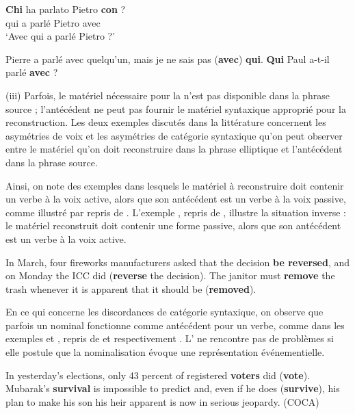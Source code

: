 \ex
\gll   *\textbf{Chi}  ha  parlato  Pietro  \textbf{con} ? \label{ch1:ex128b}\\
qui  a  parlé  Pietro  avec\\
\glt ‘Avec qui a parlé Pietro ?’ 
\z
\z


\ea \label{ch1:ex129}
\ea  Pierre a parlé avec quelqu’un, mais je ne sais pas (\textbf{avec}) \textbf{qui}. 
\ex  *\textbf{Qui} Paul a-t-il parlé \textbf{avec} ? 
\z
\z

(iii) Parfois, le matériel nécessaire pour la  n’est pas disponible dans la phrase source ; l’antécédent ne peut pas fournir le matériel syntaxique approprié pour la reconstruction. Les deux exemples discutés dans la littérature concernent les asymétries de voix et les asymétries de catégorie syntaxique qu’on peut observer entre le matériel qu’on doit reconstruire dans la phrase elliptique et l’antécédent dans la phrase source. 

Ainsi, on note des exemples dans lesquels le matériel à reconstruire doit contenir un verbe à la voix active, alors que son antécédent est un verbe à la voix passive, comme illustré par  repris de \citet{Dalrymple2005}. L’exemple , repris de \citet{Merchant2008a}, illustre la situation inverse : le matériel reconstruit doit contenir une forme passive, alors que son antécédent est un verbe à la voix active. 

\ea \label{ch1:ex130}
\ea  In March, four fireworks manufacturers asked that the decision \textbf{be reversed}, and on Monday the ICC did (\textbf{reverse} the decision). \label{ch1:ex130a} 
\ex  The janitor must \textbf{remove} the trash whenever it is apparent that it should be (\textbf{removed}). \label{ch1:ex130b} 
\z
\z

En ce qui concerne les discordances de catégorie syntaxique, on observe que parfois un nominal fonctionne comme antécédent pour un verbe, comme dans les exemples  et , repris de \citet{Kennedy2003} et respectivement \citet{MillerEtAl2014b}. L’ ne rencontre pas de problèmes si elle postule que la nominalisation évoque une représentation événementielle.

\ea
\ea  In yesterday’s elections, only 43 percent of registered \textbf{voters} did (\textbf{vote}). \label{ch1:ex131a} 
\ex  Mubarak’s \textbf{survival} is impossible to predict and, even if he does (\textbf{survive}), his plan to make his son his heir apparent is now in serious jeopardy. (COCA) \label{ch1:ex131b}
\z
\z

